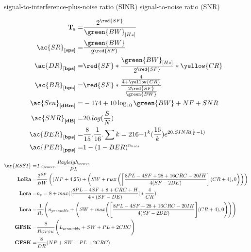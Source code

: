 signal-to-interference-plus-noise ratio (SINR)
signal-to-noise ratio (SNR)


\begin{align}
\textbf{T}_{\textbf{s}}=     & \frac{2^{\red{SF}}}{\green{BW}_{[Hz]}}\\
\ac{SR}_{\textbf{[sps]}}=    & \frac{\green{BW}}{2^{\red{SF}}}\\
\ac{DR}_{\textbf{[bps]}}    =& \red{SF}*\frac{\green{BW}_{[Hz]}}{2^{\red{SF}}}*\yellow{CR}\\
\ac{BR}_{\textbf{[bps]}}    =& \red{SF} * \frac{\frac{4}{4+\yellow{CR}}}{\frac{2 \red{SF}}{\green{BW}}}\\
\ac{Sen}_{\textbf{[dBm]}} =  & -174+10 \log _{10} \green{BW} + NF + SNR\\
\ac{SNR}_{\textbf{[dB]}} =   & 20.log(\frac{S}{N})\\
\ac{BER}_{\textbf{[bps]}} =  & \frac{8}{15}.\frac{1}{16}.\sum{k=2}{16}{-1^{k}(\frac{16}{k})e^{20.SINR(\frac{1}{k}-1)}}\\
\ac{PER}_{\textbf{[pps]}}=   & 1-(1-BER)^{n_{bits}}\\
\end{align}



\begin{align}
\ac{RSSI} = & Tx_{power}.\frac{Rayleigh_{power}}{PL}\\
\textbf{LoRa}=                                       & \frac{2^{S F}}{B W}\left((N P+4.25)+\left(S W+\max \left(\left\lceil\frac{8 P L-4 S F+28+16 C R C-20 I H}{4(S F-2 D E)}\right](C R+4), 0\right)\right)\right)\\
\textbf{Lora}=                                       & n_{s}=8+max([\frac{8PL-4SF+8+CRC+H}{4*(SF-DE)}]*\frac{4}{CR})\\
\textbf{Lora}=                                       & \frac{1}{R_{s}} \Bigg(n_{preamble} + \Bigg(SW + max\Bigg(\Bigg[\frac{8PL - 4SF + 28 + 16CRC -20IH}{4(SF-2DE)}\Bigg](CR+4),0\Bigg)\Bigg)\Bigg)\\
\textbf{GFSK}=                                       & \frac{8}{R_{GFSK}}\Bigg(L_{preamble} + SW + PL + 2CRC\Bigg)\\
\textbf{GFSK}=                                       & \frac{8}{D R}(N P+S W+P L+2 C R C)\\
\end{align}


